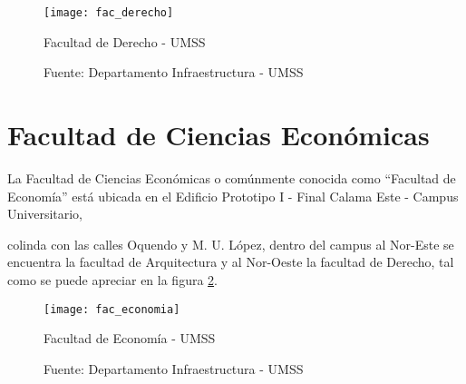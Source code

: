  \begin{figure}[H]
   \begin{center}
     \texttt{[image: fac\_derecho]}
     \caption{Facultad de Derecho - UMSS}
     \label{fig:fac_derecho}
     \caption*{Fuente: Departamento Infraestructura - UMSS}

   \end{center}
 \end{figure}









\section{Facultad de Ciencias Económicas}
\label{sec:facultad_economia}

      La Facultad de Ciencias Económicas o comúnmente conocida como ``Facultad de Economía'' está ubicada en el Edificio Prototipo I - Final Calama Este - Campus Universitario,

      colinda con las calles Oquendo y M. U. López, dentro del campus al Nor-Este se encuentra la facultad de Arquitectura y al Nor-Oeste la facultad de Derecho, tal como se puede apreciar en la figura \ref{fig:fac_economia}.

      \begin{figure}[H]
       \begin{center}
         \texttt{[image: fac\_economia]}
         \caption{Facultad de Economía - UMSS}
         \label{fig:fac_economia}
         \caption*{Fuente: Departamento Infraestructura - UMSS}

       \end{center}
      \end{figure}


